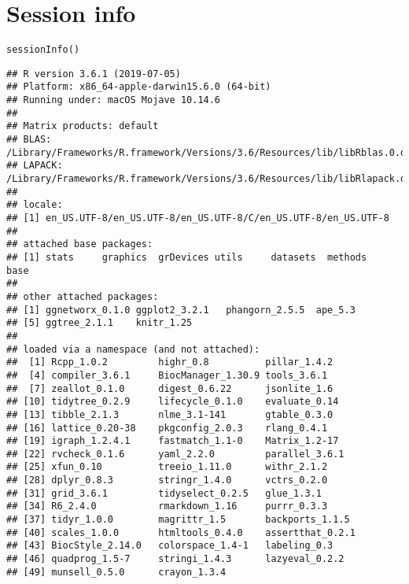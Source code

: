 \documentclass{article}\usepackage[]{graphicx}\usepackage[usenames,dvipsnames]{color}
\newcommand{\hlstd}[1]{\textcolor[rgb]{0.251,0.251,0.251}{#1}}%
\newcommand{\hlkwd}[1]{\textcolor[rgb]{0.878,0.439,0.125}{#1}}%
\newenvironment{knitrout}{}{} %
\begin{document}
\section{Session info}
\begin{knitrout}
\color{fgcolor}\begin{kframe}
\begin{alltt}
\hlkwd{sessionInfo}\hlstd{()}
\end{alltt}
\begin{verbatim}
## R version 3.6.1 (2019-07-05)
## Platform: x86_64-apple-darwin15.6.0 (64-bit)
## Running under: macOS Mojave 10.14.6
## 
## Matrix products: default
## BLAS:   /Library/Frameworks/R.framework/Versions/3.6/Resources/lib/libRblas.0.dylib
## LAPACK: /Library/Frameworks/R.framework/Versions/3.6/Resources/lib/libRlapack.dylib
## 
## locale:
## [1] en_US.UTF-8/en_US.UTF-8/en_US.UTF-8/C/en_US.UTF-8/en_US.UTF-8
## 
## attached base packages:
## [1] stats     graphics  grDevices utils     datasets  methods   base     
## 
## other attached packages:
## [1] ggnetworx_0.1.0 ggplot2_3.2.1   phangorn_2.5.5  ape_5.3        
## [5] ggtree_2.1.1    knitr_1.25     
## 
## loaded via a namespace (and not attached):
##  [1] Rcpp_1.0.2         highr_0.8          pillar_1.4.2      
##  [4] compiler_3.6.1     BiocManager_1.30.9 tools_3.6.1       
##  [7] zeallot_0.1.0      digest_0.6.22      jsonlite_1.6      
## [10] tidytree_0.2.9     lifecycle_0.1.0    evaluate_0.14     
## [13] tibble_2.1.3       nlme_3.1-141       gtable_0.3.0      
## [16] lattice_0.20-38    pkgconfig_2.0.3    rlang_0.4.1       
## [19] igraph_1.2.4.1     fastmatch_1.1-0    Matrix_1.2-17     
## [22] rvcheck_0.1.6      yaml_2.2.0         parallel_3.6.1    
## [25] xfun_0.10          treeio_1.11.0      withr_2.1.2       
## [28] dplyr_0.8.3        stringr_1.4.0      vctrs_0.2.0       
## [31] grid_3.6.1         tidyselect_0.2.5   glue_1.3.1        
## [34] R6_2.4.0           rmarkdown_1.16     purrr_0.3.3       
## [37] tidyr_1.0.0        magrittr_1.5       backports_1.1.5   
## [40] scales_1.0.0       htmltools_0.4.0    assertthat_0.2.1  
## [43] BiocStyle_2.14.0   colorspace_1.4-1   labeling_0.3      
## [46] quadprog_1.5-7     stringi_1.4.3      lazyeval_0.2.2    
## [49] munsell_0.5.0      crayon_1.3.4
\end{verbatim}
\end{kframe}
\end{knitrout}
\end{document}

